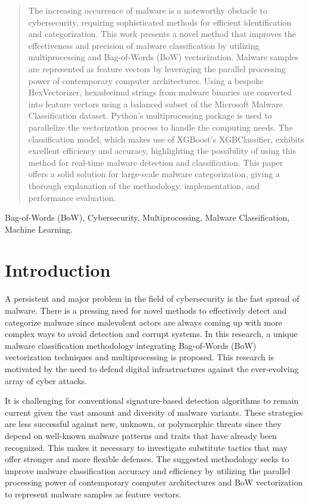 \documentclass[conference]{IEEEtran}
\begin{document}
\maketitle

\begin{abstract}
    The increasing occurrence of malware is a noteworthy obstacle to cybersecurity, requiring sophisticated methods for efficient identification and categorization. This work presents a novel method that improves the effectiveness and precision of malware classification by utilizing multiprocessing and Bag-of-Words (BoW) vectorization. Malware samples are represented as feature vectors by leveraging the parallel processing power of contemporary computer architectures. Using a bespoke HexVectorizer, hexadecimal strings from malware binaries are converted into feature vectors using a balanced subset of the Microsoft Malware Classification dataset. Python's multiprocessing package is used to parallelize the vectorization process to handle the computing needs. The classification model, which makes use of XGBoost's XGBClassifier, exhibits excellent efficiency and accuracy, highlighting the possibility of using this method for real-time malware detection and classification. This paper offers a solid solution for large-scale malware categorization, giving a thorough explanation of the methodology, implementation, and performance evaluation.
\end{abstract}

\begin{IEEEkeywords}
    Bag-of-Words (BoW), Cybersecurity, Multiprocessing, Malware Classification, Machine Learning.
\end{IEEEkeywords}

\section{Introduction}
A persistent and major problem in the field of cybersecurity is the fast spread of malware. There is a pressing need for novel methods to effectively detect and categorize malware since malevolent actors are always coming up with more complex ways to avoid detection and corrupt systems. In this research, a unique malware classification methodology integrating Bag-of-Words (BoW) vectorization techniques and multiprocessing is proposed. This research is motivated by the need to defend digital infrastructures against the ever-evolving array of cyber attacks.

It is challenging for conventional signature-based detection algorithms to remain current given the vast amount and diversity of malware variants. These strategies are less successful against new, unknown, or polymorphic threats since they depend on well-known malware patterns and traits that have already been recognized. This makes it necessary to investigate substitute tactics that may offer stronger and more flexible defenses. The suggested methodology seeks to improve malware classification accuracy and efficiency by utilizing the parallel processing power of contemporary computer architectures and BoW vectorization to represent malware samples as feature vectors. 
\end{document}
